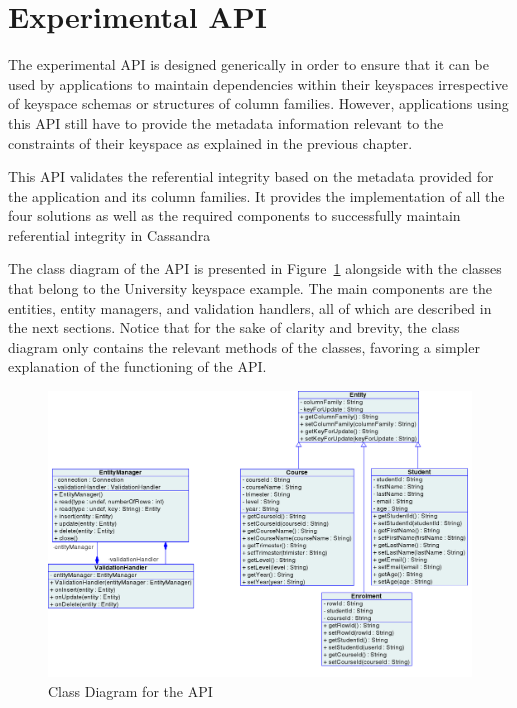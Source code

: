 \section{Experimental API}\label{s:implementation-API}

The experimental \ac{API} is designed generically in order to ensure
that it can be used by  applications to maintain dependencies within their
keyspaces irrespective of keyspace schemas or structures of column
families.  However,  applications using this \ac{API} still have to provide
 the metadata information relevant to the constraints of their keyspace as
 explained in the previous chapter.  

This \ac{API} validates the referential integrity based on the metadata provided
for the application and its column families.   It  provides the implementation of
all the four solutions as well as the required components to successfully
maintain referential integrity in Cassandra 

The  class diagram of the \ac{API} is presented  in
 Figure~\ref{f:classDiagram} alongside with the  classes that belong to 
the University keyspace example.  The main components are the entities,  entity
managers,  and validation handlers,  all of which are described in the next sections.   
 Notice that for the sake of clarity and brevity,   the class diagram only
 contains  the relevant  methods of the classes,  favoring a simpler
explanation of the functioning of the \ac{API}. 

\begin{figure}[h]  
	\centering
	\includegraphics[width=\textwidth]{./figure/Solutions/FinalClassDiagram.png}
	\caption{Class Diagram for the \ac{API}}\label{f:classDiagram}
\end{figure}


